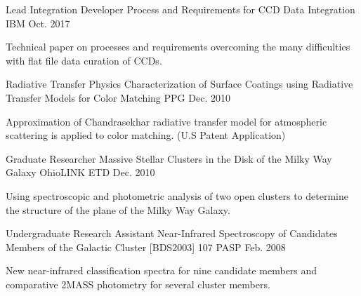 

\begin{cventries}

  \cventry
    {Lead Integration Developer} %
    {Process and Requirements for CCD Data Integration} %
    {IBM} %
    {Oct. 2017} %
    {
      \begin{cvitems} %
        \item {Technical paper on processes and requirements overcoming the many difficulties with flat file data curation of CCDs.}
      \end{cvitems}
    }

  \cventry
    {Radiative Transfer Physics} %
    {Characterization of Surface Coatings using Radiative Transfer Models for Color Matching} %
    {PPG} %
    {Dec. 2010} %
    {
      \begin{cvitems} %
        \item {Approximation of Chandrasekhar radiative transfer model for atmospheric scattering is applied to color matching.  (U.S Patent Application)}
      \end{cvitems}
    }

  \cventry
    {Graduate Researcher} %
    {Massive Stellar Clusters in the Disk of the Milky Way Galaxy} %
    {OhioLINK ETD} %
    {Dec. 2010} %
    {
      \begin{cvitems} %
        \item {Using spectroscopic and photometric analysis of two open clusters to determine the structure of the plane of the Milky Way Galaxy.}
      \end{cvitems}
    }

  \cventry
    {Undergraduate Research Assistant} %
    {Near-Infrared Spectroscopy of Candidates Members of the Galactic Cluster [BDS2003] 107} %
    {PASP} %
    {Feb. 2008} %
    {
      \begin{cvitems} %
        \item {New near-infrared classification spectra for nine candidate members and comparative 2MASS photometry for several cluster members.}
      \end{cvitems}
    }

\end{cventries}
